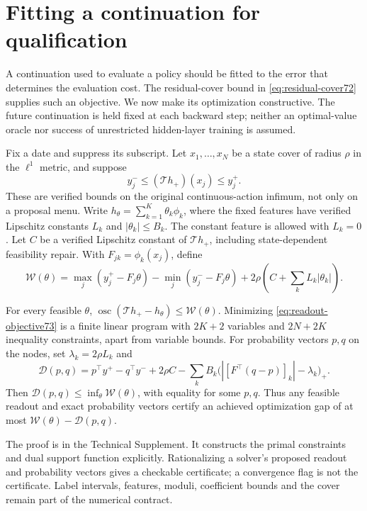 \section{Fitting a continuation for qualification}\label{sec:qualification73}
A continuation used to evaluate a policy should be fitted to the error that determines the evaluation cost. The residual-cover bound in \eqref{eq:residual-cover72} supplies such an objective. We now make its optimization constructive. The future continuation is held fixed at each backward step; neither an optimal-value oracle nor success of unrestricted hidden-layer training is assumed.

Fix a date and suppress its subscript. Let $x_1,\ldots,x_N$ be a state cover of radius $\rho$ in the $\ell^1$ metric, and suppose
\[
 y_j^-\le (\mathcal T h_+)(x_j)\le y_j^+.
\]
These are verified bounds on the original continuous-action infimum, not only on a proposal menu. Write $h_\theta=\sum_{k=1}^K\theta_k\phi_k$, where the fixed features have verified Lipschitz constants $L_k$ and $|\theta_k|\le B_k$. The constant feature is allowed with $L_k=0$. Let $C$ be a verified Lipschitz constant of $\mathcal T h_+$, including state-dependent feasibility repair. With $F_{jk}=\phi_k(x_j)$, define
\begin{equation}\label{eq:readout-objective73}
 \mathcal W(\theta)=\max_j(y_j^+-F_j\theta)
       -\min_j(y_j^--F_j\theta)
       +2\rho\left(C+\sum_k L_k|\theta_k|\right).
\end{equation}

\begin{theorem}\label{thm:readout73}
For every feasible $\theta$, $\operatorname{osc}(\mathcal T h_+-h_\theta)\le\mathcal W(\theta)$. Minimizing \eqref{eq:readout-objective73} is a finite linear program with $2K+2$ variables and $2N+2K$ inequality constraints, apart from variable bounds. For probability vectors $p,q$ on the nodes, set $\lambda_k=2\rho L_k$ and
\begin{equation}\label{eq:readout-dual73}
 \mathcal D(p,q)=p^\top y^+-q^\top y^-+2\rho C
   -\sum_k B_k\bigl(|[F^\top(q-p)]_k|-\lambda_k\bigr)_+.
\end{equation}
Then $\mathcal D(p,q)\le\inf_\theta\mathcal W(\theta)$, with equality for some $p,q$. Thus any feasible readout and exact probability vectors certify an achieved optimization gap of at most $\mathcal W(\theta)-\mathcal D(p,q)$.
\end{theorem}

The proof is in the Technical Supplement. It constructs the primal constraints and dual support function explicitly. Rationalizing a solver's proposed readout and probability vectors gives a checkable certificate; a convergence flag is not the certificate. Label intervals, features, moduli, coefficient bounds and the cover remain part of the numerical contract.

